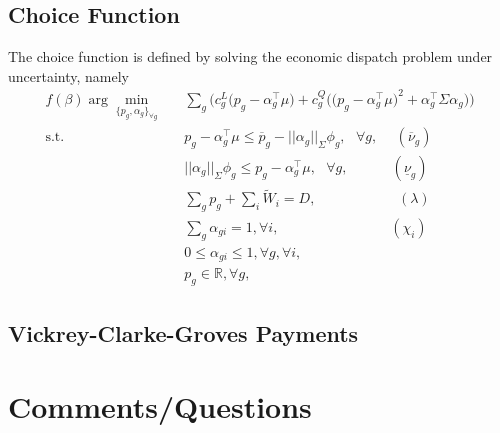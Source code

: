 \documentclass{article}
\begin{document}
\subsection{Choice Function}

The choice function is defined by solving the economic dispatch problem under uncertainty, namely
\begin{align}
f(\beta) \arg \underset{\{p_g, \alpha_g\}_{\forall g}}{\min} \hspace{10pt} & \sum_g \Big(c_g^L\big(p_g - \alpha_g^\top \mu\big) + c_g^Q \Big(\big(p_g - \alpha_g^\top \mu \big)^2 + \alpha_g^\top \Sigma \alpha_g\Big)\Big)\\
\mbox{s.t. } & p_g - \alpha_g^\top \mu\le \overline{p}_g - ||\alpha_g||_{\Sigma} \phi_g, \mbox{ }\forall g, \hspace{15pt}(\overline{\nu}_g)\\
& ||\alpha_g||_{\Sigma} \phi_g \le p_g - \alpha_g^\top \mu, \mbox{ }\forall g, \hspace{37pt}(\underline{\nu}_g)\\
& \sum_g p_g + \sum_i \tilde{W}_i = D, \hspace{70pt} (\lambda)\\
& \sum_g \alpha_{gi} = 1, \forall i, \hspace{95pt} (\chi_i)\\
& 0 \le \alpha_{gi} \le 1, \forall g, \forall i,\\
& p_g \in \mathbb{R}, \forall g,
\end{align}

\subsection{Vickrey-Clarke-Groves Payments}

\section{Comments/Questions}
\end{document}
